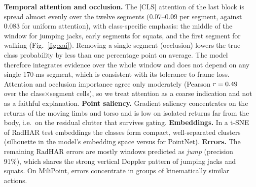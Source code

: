 \textbf{Temporal attention and occlusion.} The [CLS] attention of the last
block is spread almost evenly over the twelve segments (0.07--0.09 per
segment, against 0.083 for uniform attention), with class-specific emphasis: the
middle of the window for jumping jacks, early segments for squats, and the
first segment for walking (Fig.~\ref{fig:xai}). Removing a single segment
(occlusion) lowers the true-class probability by less than one percentage point
on average. The model therefore integrates evidence over the whole window and
does not depend on any single 170-ms segment, which is consistent with its
tolerance to frame loss. Attention and occlusion importance agree only
moderately (Pearson $r=0.49$ over the class$\times$segment cells), so we
treat attention as a coarse indication and not as a faithful explanation.
\textbf{Point saliency.} Gradient saliency concentrates on the returns of the
moving limbs and torso and is low on isolated returns far from the body,
i.e.\ on the residual clutter that survives gating. \textbf{Embeddings.} In a
t-SNE of RadHAR test embeddings the classes form compact, well-separated
clusters (silhouette \silSTPTLiteKDrobust{} in the model's embedding space
versus \silPointNet{} for PointNet). \textbf{Errors.} The remaining RadHAR
errors are mostly windows predicted as \emph{jump} (precision 91\%), which
shares the strong vertical Doppler pattern of jumping jacks and squats. On
MiliPoint, errors concentrate in groups of kinematically similar actions.

